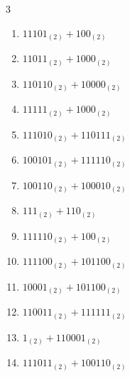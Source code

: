 \begin{multicols}{3}
\begin{enumerate}
  \item $11101_{(2)} + 100_{(2)}$


  \item $11011_{(2)} + 1000_{(2)}$


  \item $110110_{(2)} + 10000_{(2)}$


  \item $11111_{(2)} + 1000_{(2)}$


  \item $111010_{(2)} + 110111_{(2)}$


  \item $100101_{(2)} + 111110_{(2)}$


\columnbreak %

  \item $100110_{(2)} + 100010_{(2)}$


  \item $111_{(2)} + 110_{(2)}$


  \item $111110_{(2)} + 100_{(2)}$


  \item $111100_{(2)} + 101100_{(2)}$


  \item $10001_{(2)} + 101100_{(2)}$


  \item $110011_{(2)} + 111111_{(2)}$


  \item $1_{(2)} + 110001_{(2)}$


  \item $111011_{(2)} + 100110_{(2)}$


\end{enumerate}
\end{multicols}
